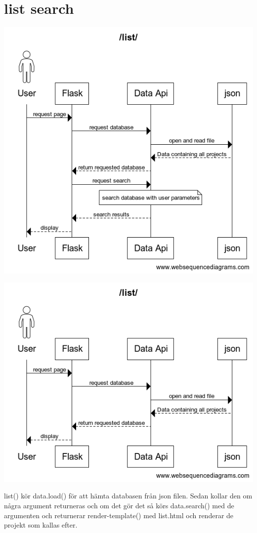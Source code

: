 \documentclass{TDP003mall}
\begin{document}
\section{list search}
\begin{center}
\includegraphics[scale=0.35]{list_search.png}
\end{center}
\begin{center}
\includegraphics[scale=0.35]{list_no_search.png}
\end{center}
list() kör data.load() för att hämta databasen från json filen. Sedan kollar den om några argument returneras och om det gör det så körs data.search() med de argumenten och returnerar render-template() med list.html och renderar de projekt som kallas efter.\\\\
\end{document}
